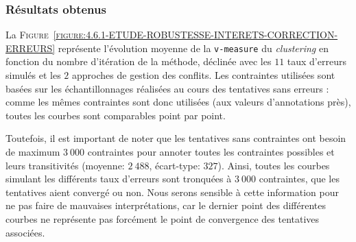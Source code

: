 		\subsubsection{Résultats obtenus}
		
			La \textsc{Figure~\ref{figure:4.6.1-ETUDE-ROBUSTESSE-INTERETS-CORRECTION-ERREURS}} représente l'évolution moyenne de la \texttt{v-measure} du \textit{clustering} en fonction du nombre d'itération de la méthode, déclinée avec les $11$ taux d'erreurs simulés et les $2$ approches de gestion des conflits.
			Les contraintes utilisées sont basées sur les échantillonnages réalisées au cours des tentatives sans erreurs : comme les mêmes contraintes sont donc utilisées (aux valeurs d'annotations près), toutes les courbes sont comparables point par point.
			
			\begin{leftBarWarning}
				Toutefois, il est important de noter que les tentatives sans contraintes ont besoin de maximum $3~000$ contraintes pour annoter toutes les contraintes possibles et leurs transitivités (moyenne: $2~488$, écart-type: $327$).
				Ainsi, toutes les courbes simulant les différents taux d'erreurs sont tronquées à $3~000$ contraintes, que les tentatives aient convergé ou non.
				Nous serons sensible à cette information pour ne pas faire de mauvaises interprétations, car le dernier point des différentes courbes ne représente pas forcément le point de convergence des tentatives associées.
			\end{leftBarWarning}
			
